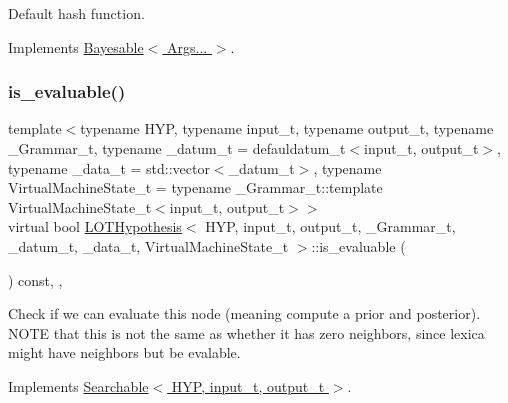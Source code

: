 Default hash function. 



Implements \hyperlink{class_bayesable_a26f6d55e7526ebd897cbb27c757b611b}{Bayesable$<$ Args... $>$}.

\mbox{\label{class_l_o_t_hypothesis_a9eeaaf321324d2418405f4d7252f6ca4}} 
\subsubsection{\texorpdfstring{is\+\_\+evaluable()}{is\_evaluable()}}
{\footnotesize\ttfamily template$<$typename H\+YP, typename input\+\_\+t, typename output\+\_\+t, typename \+\_\+\+Grammar\+\_\+t, typename \+\_\+datum\+\_\+t = defauldatum\+\_\+t$<$input\+\_\+t, output\+\_\+t$>$, typename \+\_\+data\+\_\+t = std\+::vector$<$\+\_\+datum\+\_\+t$>$, typename Virtual\+Machine\+State\+\_\+t = typename \+\_\+\+Grammar\+\_\+t\+::template Virtual\+Machine\+State\+\_\+t$<$input\+\_\+t, output\+\_\+t$>$$>$ \\
virtual bool \hyperlink{class_l_o_t_hypothesis}{L\+O\+T\+Hypothesis}$<$ H\+YP, input\+\_\+t, output\+\_\+t, \+\_\+\+Grammar\+\_\+t, \+\_\+datum\+\_\+t, \+\_\+data\+\_\+t, Virtual\+Machine\+State\+\_\+t $>$\+::is\+\_\+evaluable (\begin{DoxyParamCaption}{ }\end{DoxyParamCaption}) const\hspace{0.3cm}{\ttfamily [inline]}, {\ttfamily [override]}, {\ttfamily [virtual]}}



Check if we can evaluate this node (meaning compute a prior and posterior). N\+O\+TE that this is not the same as whether it has zero neighbors, since lexica might have neighbors but be evalable. 



Implements \hyperlink{class_searchable_a23786e95730117c3cc4b90e010494a1e}{Searchable$<$ H\+Y\+P, input\+\_\+t, output\+\_\+t $>$}.

\mbox{\label{class_l_o_t_hypothesis_a34fb9e13bc6855d6599c1c3e62d88933}} 
